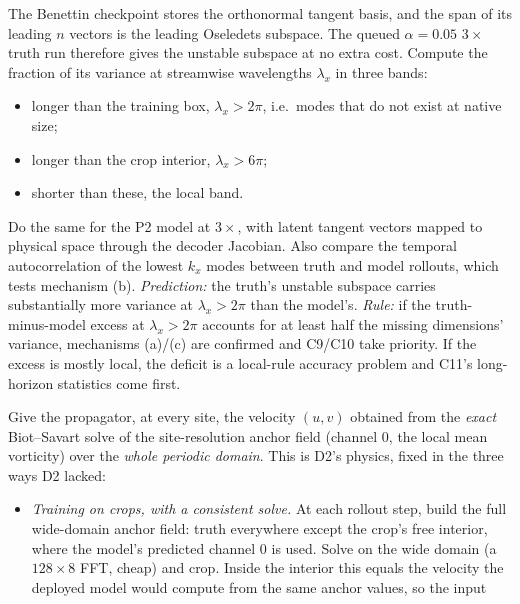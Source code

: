 \documentclass[11pt]{article}
\begin{document}
\begin{description}[leftmargin=*]
\item[C8 --- where do the missing dimensions live? (diagnostic, cheap).]
  The Benettin checkpoint stores the orthonormal tangent basis, and the
  span of its leading $n$ vectors is the leading Oseledets subspace. The
  queued $\alpha{=}0.05$ $3\times$ truth run therefore gives the unstable
  subspace at no extra cost. Compute the fraction of its variance at
  streamwise wavelengths $\lambda_x$ in three bands:
  \begin{itemize}[leftmargin=*]
  \item longer than the training box, $\lambda_x>2\pi$, i.e.\ modes that
    do not exist at native size;
  \item longer than the crop interior, $\lambda_x>6\pi$;
  \item shorter than these, the local band.
  \end{itemize}
  Do the same for the P2 model at $3\times$, with latent tangent vectors
  mapped to physical space through the decoder Jacobian. Also compare the
  temporal autocorrelation of the lowest $k_x$ modes between truth and
  model rollouts, which tests mechanism (b).
  \emph{Prediction:} the truth's unstable subspace carries substantially
  more variance at $\lambda_x>2\pi$ than the model's.
  \emph{Rule:} if the truth-minus-model excess at $\lambda_x>2\pi$ accounts
  for at least half the missing dimensions' variance, mechanisms (a)/(c)
  are confirmed and C9/C10 take priority. If the excess is mostly local,
  the deficit is a local-rule accuracy problem and C11's long-horizon
  statistics come first.
\item[C9 --- learn the local, solve the non-local.] Give the propagator,
  at every site, the velocity $(u,v)$ obtained from the \emph{exact}
  Biot--Savart solve of the site-resolution anchor field (channel 0, the
  local mean vorticity) over the \emph{whole periodic domain}. This is
  D2's physics, fixed in the three ways D2 lacked:
  \begin{itemize}[leftmargin=*]
  \item \emph{Training on crops, with a consistent solve.} At each
    rollout step, build the full wide-domain anchor field: truth
    everywhere except the crop's free interior, where the model's
    predicted channel 0 is used. Solve on the wide domain (a $128\times8$
    FFT, cheap) and crop. Inside the interior this equals the velocity the
    deployed model would compute from the same anchor values, so the input

\end{itemize}
\end{description}
\end{document}
